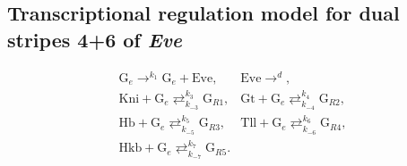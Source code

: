 \documentclass[final,authoryear, 5p, times]{elsarticle}
\begin{document}
\subsection{Transcriptional regulation model for dual stripes 4+6 of \textit{Eve}}

\begin{equation}  \label{S46systemSup}
 \begin{array}{ll}
        \displaystyle
        \text{G}_e \mathop{\longrightarrow}^{k_{1}} \text{G}_e + \text{Eve}, & \displaystyle
        \text{Eve} \mathop{\longrightarrow}^{d}, \\ \displaystyle
        \text{Kni} + \text{G}_e \mathop{\rightleftarrows}^{k_{3}}_{k_{-3}} \text{G}_{R1}, & \displaystyle
        \text{Gt} + \text{G}_e \mathop{\rightleftarrows}^{k_{4}}_{k_{-4}} \text{G}_{R2}, \\ \displaystyle
        \text{Hb} + \text{G}_e \mathop{\rightleftarrows}^{k_{5}}_{k_{-5}} \text{G}_{R3},&\displaystyle
        \text{Tll} + \text{G}_e \mathop{\rightleftarrows}^{k_{6}}_{k_{-6}} \text{G}_{R4}, \\ \displaystyle
        \text{Hkb} + \text{G}_e \mathop{\rightleftarrows}^{k_{7}}_{k_{-7}} \text{G}_{R5}. &
    \end{array}
\end{equation}
\end{document}
